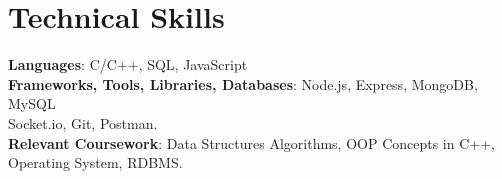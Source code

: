 \documentclass[letterpaper,11pt]{article}
\begin{document}
\section{Technical Skills}
\begin{itemize}[leftmargin=0.15in, label={}]
   \small{\item{
    \textbf{Languages}{: C/C++, SQL, JavaScript}
    \\
    \vspace{4pt}
\textbf{Frameworks, Tools, Libraries, Databases}: Node.js, Express, MongoDB, MySQL\\ Socket.io, Git, Postman.}\\
    \vspace{4pt}
    \textbf{Relevant Coursework}{: Data Structures Algorithms, OOP Concepts in C++, Operating System, RDBMS.} \\
   }
\end{itemize}
\vspace{-9pt}
\end{document}
